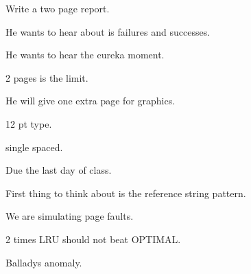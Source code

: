 \documentclass{article}
\begin{document}
Write a two page report.

He wants to hear about is failures and successes.

He wants to hear the eureka moment.

2 pages is the limit.

He will give one extra page for graphics.

12 pt type.

single spaced.

Due the last day of class.

First thing to think about is the reference string pattern.

We are simulating page faults.

2 times LRU should not beat OPTIMAL.

Balladys anomaly.
\end{document}
